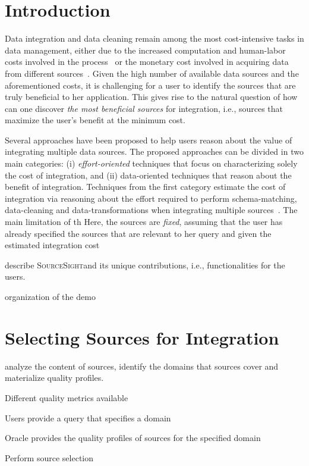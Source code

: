 \documentclass{vldb}
\newcommand\system{\textsc{SourceSight}}
\begin{document}
\section{Introduction}
Data integration and data cleaning remain among the most cost-intensive tasks in data management, either due to the increased computation and human-labor costs involved in the process~\cite{kruse2015estimating} or the monetary cost involved in acquiring data from different sources~\cite{balazinska:vldb11}. Given the high number of available data sources and the aforementioned costs, it is challenging for a user to identify the sources that are truly beneficial to her application. This gives rise to the natural question of how can one discover {\em the most beneficial sources} for integration, i.e., sources that maximize the user's benefit at the minimum cost. 

Several approaches have been proposed to help users reason about the value of integrating multiple data sources. The proposed approaches can be divided in two main categories: (i) {\em effort-oriented} techniques that focus on characterizing solely the cost of integration, and (ii) data-oriented techniques that reason about the benefit of integration. Techniques from the first category estimate the cost of integration via reasoning about the effort required to perform schema-matching, data-cleaning and data-transformations when integrating multiple sources~\cite{kruse2015estimating, smith:2009}. The main limitation of th Here, the sources are {\em fixed}, assuming that the user has already specified the sources that are relevant to her query and given the estimated integration cost 

describe \system and its unique contributions, i.e., functionalities for the users.

organization of the demo

\section{Selecting Sources for Integration}

analyze the content of sources, identify the domains that sources cover and materialize quality profiles. 

Different quality metrics available 

Users provide a query that specifies a domain

Oracle provides the quality profiles of sources for the specified domain

Perform source selection
\end{document}
